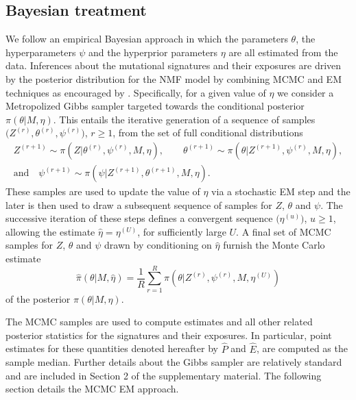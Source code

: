 \documentclass{bioinfo}
\begin{document}
\subsection{Bayesian treatment}
We follow an empirical Bayesian approach in which the parameters
$\theta$, the hyperparameters $\psi$ and the hyperprior parameters
$\eta$ are all estimated from the data.  Inferences about the
mutational signatures and their exposures are driven by the posterior
distribution for the NMF model by combining MCMC and EM techniques as
encouraged by \cite{C01}. Specifically, for a given value of $\eta$ we
consider a Metropolized Gibbs sampler targeted towards the conditional
posterior $\pi(\theta|M, \eta)$. This entails the iterative generation
of a sequence of samples $\big(Z^{(r)}, \theta^{(r)},
\psi^{(r)}\big)$, $r \geqslant 1$, from the set of full conditional
distributions
\begin{gather*}
   Z^{(r+1)} \sim \pi(Z| \theta^{(r)}, \psi^{(r)}, M, \eta), \qquad
   \theta^{(r+1)} \sim \pi(\theta| Z^{(r+1)}, \psi^{(r)}, M, \eta), \\
       \text{and}\quad
   \psi^{(r+1)} \sim \pi(\psi| Z^{(r+1)}, \theta^{(r+1)}, M, \eta).
\end{gather*}
These samples are used to update the value of $\eta$ via a stochastic
EM step and the later is then used to draw a subsequent sequence of
samples for $Z$, $\theta$ and $\psi$. The successive iteration of
these steps defines a convergent sequence $\big(\eta^{(u)}\big)$, $u
\geq 1$, allowing the estimate $\hat\eta = \eta^{(U)}$, for
sufficiently large $U$. A final set of MCMC samples for $Z$, $\theta$
and $\psi$ drawn by conditioning on $\hat\eta$ furnish the 
Monte Carlo estimate
\begin{equation}
 \label{eqn:MCEM_estimate}
   \widehat{\pi}(\theta|M, \hat\eta)
 = 
   \frac{1}{R}\sum_{r=1}^R \pi(\theta|Z^{(r)}, \psi^{(r)}, M,
   \eta^{(U)})
\end{equation}
of the posterior $\pi(\theta|M, \eta)$.


The MCMC samples are used to compute estimates and all other related
posterior statistics for the signatures and their exposures.  In
particular, point estimates for these quantities denoted hereafter by
$\widehat P$ and $\widehat E$, are computed as the sample
median. Further details about the Gibbs sampler are relatively
standard and are included in Section 2 of the supplementary
material. The following section details the MCMC EM approach.
\end{document}

